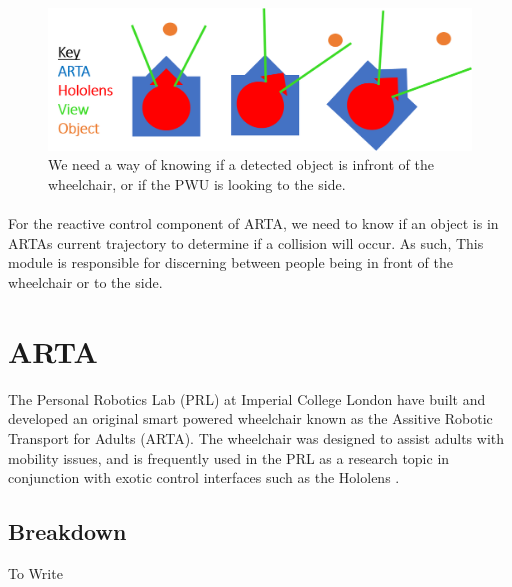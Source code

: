 \begin{figure}[ht!]
	\centering
	\includegraphics[width=0.9\linewidth]{img/chapter4_analysis/holoArtaAligned.png}
	\caption{We need a way of knowing if a detected object is infront of the wheelchair, or if the PWU is looking to the side. }
	\label{fig:holoArtaAlignment}
\end{figure}

\paragraph{}For the reactive control component of ARTA, we need to know if an object is in ARTAs current trajectory to determine if a collision will occur. As such, This module is responsible for discerning between people being in front of the wheelchair or to the side. 

\section{ARTA}
The Personal Robotics Lab (PRL) at Imperial College London have built and developed an original smart powered wheelchair known as the Assitive Robotic Transport for Adults (ARTA). The wheelchair was designed to assist adults with mobility issues, and is frequently used in the PRL as a research topic in conjunction with exotic control interfaces such as the Hololens \cite{Zolotas2018, Chacon-Quesada}.

\subsection{Breakdown}

To Write
